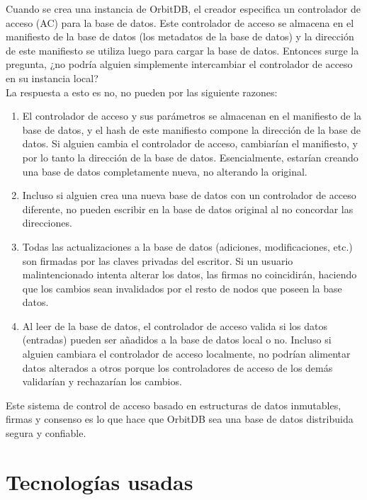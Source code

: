 Cuando se crea una instancia de OrbitDB, el creador especifica un controlador de acceso (AC) para la base de datos.
Este controlador de acceso se almacena en el manifiesto de la base de datos (los metadatos de la base de datos)
y la dirección de este manifiesto se utiliza luego para cargar la base de datos. Entonces surge la pregunta, ¿no podría alguien simplemente intercambiar el controlador de acceso en su instancia local?
\\
La respuesta a esto es no, no pueden por las siguiente razones:
\begin{enumerate}[noitemsep,after=\vspace{-0.4\baselineskip}]
  \item El controlador de acceso y sus parámetros se almacenan en el manifiesto de la base de datos, y el hash de este manifiesto compone la dirección de la base de datos. Si alguien cambia el controlador de acceso, cambiarían el manifiesto, y por lo tanto la dirección de la base de datos. Esencialmente, estarían creando una base de datos completamente nueva, no alterando la original.
  \item Incluso si alguien crea una nueva base de datos con un controlador de acceso diferente, no pueden escribir en la base de datos original al no concordar las direcciones.
  \item Todas las actualizaciones a la base de datos (adiciones, modificaciones, etc.) son firmadas por las claves privadas del escritor. Si un usuario malintencionado intenta alterar los datos, las firmas no coincidirán, haciendo que los cambios sean invalidados por el resto de nodos que poseen la base datos.
  \item Al leer de la base de datos, el controlador de acceso valida si los datos (entradas) pueden ser añadidos a la base de datos local o no. Incluso si alguien cambiara el controlador de acceso localmente, no podrían alimentar datos alterados a otros porque los controladores de acceso de los demás validarían y rechazarían los cambios.
\end{enumerate}

Este sistema de control de acceso basado en estructuras de datos inmutables, firmas y consenso es lo que hace que OrbitDB sea una base de datos distribuida segura y confiable.




\section{Tecnologías usadas}\label{sect:tecnologias}


